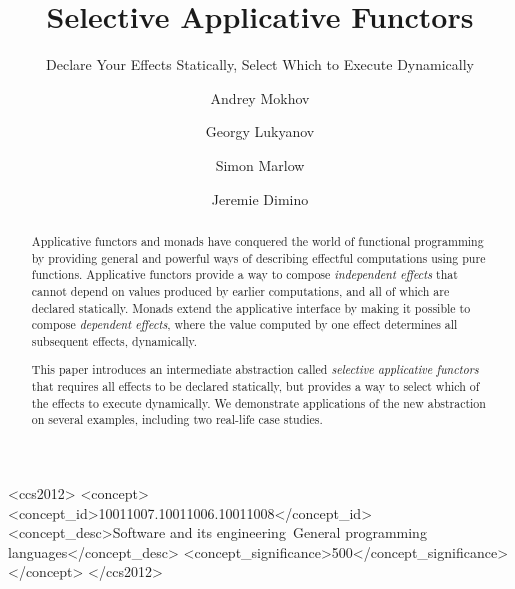 \documentclass[acmsmall,review]{acmart}\settopmatter{printfolios=true}
\begin{document}
\title{Selective Applicative Functors}
\subtitle{Declare Your Effects Statically, Select Which to Execute Dynamically}

\author{Andrey Mokhov}
\author{Georgy Lukyanov}
\author{Simon Marlow}
\author{Jeremie Dimino}


\begin{abstract}
Applicative functors and monads have conquered the world of functional
programming by providing general and powerful ways of describing effectful
computations using pure functions. Applicative functors provide a way to compose
\emph{independent effects} that cannot depend on values produced by earlier
computations, and all of which are declared statically. Monads extend the
applicative interface by making it possible to compose \emph{dependent effects},
where the value computed by one effect determines all subsequent effects,
dynamically.

This paper introduces an intermediate abstraction called \emph{selective
applicative functors} that requires all effects to be declared statically, but
provides a way to select which of the effects to execute dynamically. We
demonstrate applications of the new abstraction on several examples, including
two real-life case studies.
\end{abstract}

\begin{CCSXML}
<ccs2012>
<concept>
<concept_id>10011007.10011006.10011008</concept_id>
<concept_desc>Software and its engineering~General programming languages</concept_desc>
<concept_significance>500</concept_significance>
</concept>
</ccs2012>
\end{CCSXML}
\end{document}
